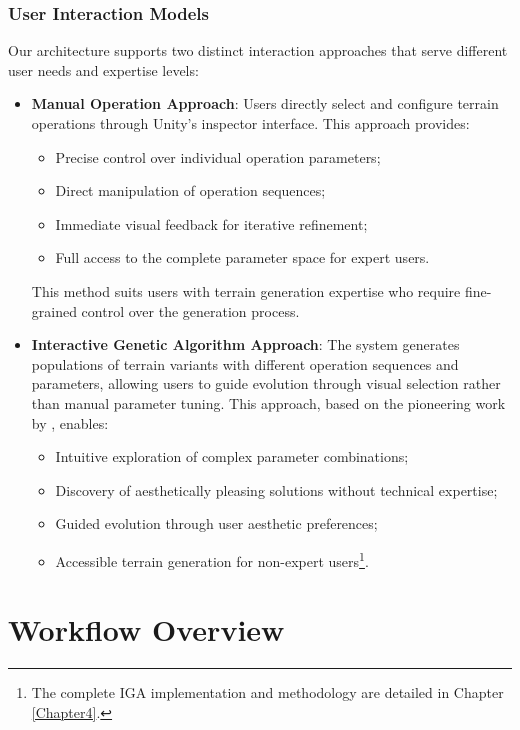 \subsubsection{User Interaction Models}
\label{interaction_models}

Our architecture supports two distinct interaction approaches that serve different user needs and expertise levels:


\begin{itemize}
    \item \textbf{Manual Operation Approach}: Users directly select and configure terrain operations through Unity's inspector interface. This approach provides:
\begin{itemize}
    \item[-] Precise control over individual operation parameters;
    \item[-] Direct manipulation of operation sequences;
    \item[-] Immediate visual feedback for iterative refinement;
    \item[-] Full access to the complete parameter space for expert users.
\end{itemize}

This method suits users with terrain generation expertise who require fine-grained control over the generation process.

    
    \item \textbf{Interactive Genetic Algorithm Approach}:
The system generates populations of terrain variants with different operation sequences and parameters, allowing users to guide evolution through visual selection rather than manual parameter tuning. This approach, based on the pioneering work by \textcite{Walsh10}, enables:
\begin{itemize}
    \item[-] Intuitive exploration of complex parameter combinations;
    \item[-] Discovery of aesthetically pleasing solutions without technical expertise;
    \item[-] Guided evolution through user aesthetic preferences;
    \item[-] Accessible terrain generation for non-expert users\footnote{The complete IGA implementation and methodology are detailed in Chapter \ref{Chapter4}.}.
\end{itemize}

\end{itemize}

\section{Workflow Overview}

